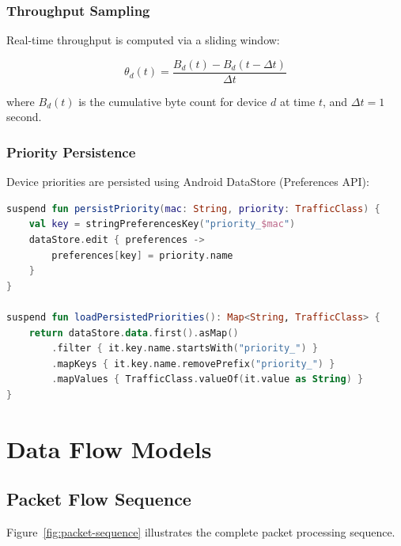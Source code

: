 \subsubsection{Throughput Sampling}

Real-time throughput is computed via a sliding window:

\begin{equation}
\theta_d(t) = \frac{B_d(t) - B_d(t - \Delta t)}{\Delta t}
\end{equation}

where $B_d(t)$ is the cumulative byte count for device $d$ at time $t$, and $\Delta t = 1$ second.

\subsubsection{Priority Persistence}

Device priorities are persisted using Android DataStore (Preferences API):

\begin{lstlisting}[language=Kotlin, caption={Priority Persistence}, label={lst:persistence}]
suspend fun persistPriority(mac: String, priority: TrafficClass) {
    val key = stringPreferencesKey("priority_$mac")
    dataStore.edit { preferences ->
        preferences[key] = priority.name
    }
}

suspend fun loadPersistedPriorities(): Map<String, TrafficClass> {
    return dataStore.data.first().asMap()
        .filter { it.key.name.startsWith("priority_") }
        .mapKeys { it.key.name.removePrefix("priority_") }
        .mapValues { TrafficClass.valueOf(it.value as String) }
}
\end{lstlisting}

\section{Data Flow Models}
\label{sec:data-flow}

\subsection{Packet Flow Sequence}

Figure~\ref{fig:packet-sequence} illustrates the complete packet processing sequence.

